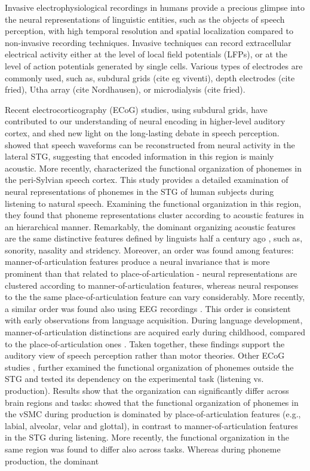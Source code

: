 Invasive electrophysiological recordings in humans provide a precious glimpse into the neural representations of linguistic entities, such as the objects of speech perception, with high temporal resolution and spatial localization compared to non-invasive recording techniques. Invasive techniques can record extracellular electrical activity either at the level of local field potentials (LFPs), or at the level of action potentials generated by single cells. Various types of electrodes are commonly used, such as, subdural grids (cite eg viventi), depth electrodes (cite fried), Utha array (cite Nordhausen), or microdialysis (cite fried).

Recent electrocorticography (ECoG) studies, using subdural grids, have contributed to our understanding of neural encoding in higher-level auditory cortex, and shed new light on the long-lasting debate in speech perception. \citet{pasley2012reconstructing} showed that speech waveforms can be reconstructed from neural activity in the lateral STG, suggesting that encoded information in this region is mainly acoustic. More recently, \citet{Mesgarani2014} characterized the functional organization of phonemes in the peri-Sylvian speech cortex. This study provides a detailed examination of neural representations of phonemes in the STG of human subjects during listening to natural speech. Examining the functional organization in this region, they found that phoneme representations cluster according to acoustic features in an hierarchical manner. Remarkably, the dominant organizing acoustic features are the same distinctive features defined by linguists half a century ago \citep{ChomskyHalle1968}, such as, sonority, nasality and stridency. Moreover, an order was found among features: manner-of-articulation features produce a neural invariance that is more prominent than that related to place-of-articulation - neural representations are clustered according to manner-of-articulation features, whereas neural responses to the the same place-of-articulation feature can vary considerably. More recently, a similar order was found also using EEG recordings \citep{khalighinejad2017dynamic}. This order is consistent with early observations from language acquisition. During language development, manner-of-articulation distinctions are acquired early during childhood, compared to the place-of-articulation ones \citep{jakobson1968child, grodzinsky2014neural}. Taken together, these findings support the auditory view of speech perception rather than motor theories. Other ECoG studies \citep{bouchard2013functional, cheung2016auditory}, further examined the functional organization of phonemes outside the STG and tested its dependency on the experimental task (listening vs. production). Results show that the organization can significantly differ across brain regions and tasks: \citet{bouchard2013functional} showed that the functional organization of phonemes in the vSMC during production is dominated by place-of-articulation features (e.g., labial, alveolar, velar and glottal), in contrast to manner-of-articulation features in the STG during listening. More recently, the functional organization in the same region was found to differ also across tasks. Whereas during phoneme production, the dominant 